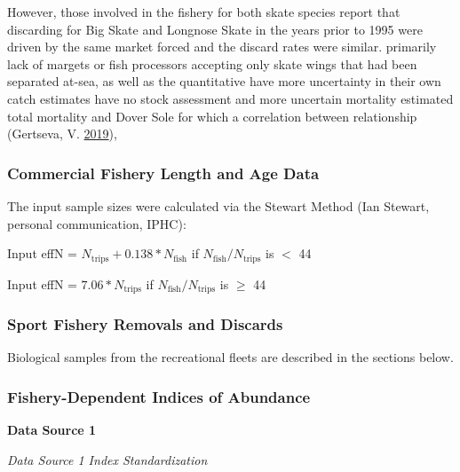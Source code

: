 \documentclass[12pt,]{article}
\begin{document}
However, those involved in the fishery for both skate species report
that discarding for Big Skate and Longnose Skate in the years prior to
1995 were driven by the same market forced and the discard rates were
similar. primarily lack of margets or fish processors accepting only
skate wings that had been separated at-sea, as well as the quantitative
have more uncertainty in their own catch estimates have no stock
assessment and more uncertain mortality estimated total mortality and
Dover Sole for which a correlation between relationship (Gertseva, V.
\protect\hyperlink{ref-Gertseva2019}{2019}),

\hypertarget{commercial-fishery-length-and-age-data}{%
\subsubsection{Commercial Fishery Length and Age
Data}\label{commercial-fishery-length-and-age-data}}

The input sample sizes were calculated via the Stewart Method (Ian
Stewart, personal communication, IPHC):

\begin{centering}

Input effN = $N_{\text{trips}} + 0.138 * N_{\text{fish}}$ if $N_{\text{fish}}/N_{\text{trips}}$ is $<$ 44

Input effN = $7.06 * N_{\text{trips}}$ if $N_{\text{fish}}/N_{\text{trips}}$ is $\geq$ 44

\end{centering}

\hypertarget{sport-fishery-removals-and-discards}{%
\subsubsection{Sport Fishery Removals and
Discards}\label{sport-fishery-removals-and-discards}}

Biological samples from the recreational fleets are described in the
sections below.

\hypertarget{fishery-dependent-indices-of-abundance}{%
\subsubsection{Fishery-Dependent Indices of
Abundance}\label{fishery-dependent-indices-of-abundance}}

\textbf{Data Source 1}

\emph{Data Source 1 Index Standardization}
\end{document}
